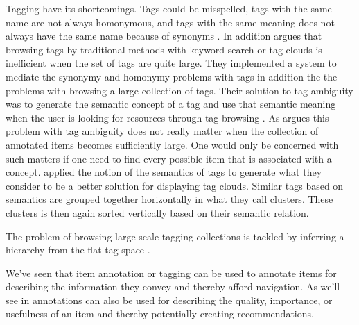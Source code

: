 Tagging have its shortcomings. Tags could be misspelled, tags with the same
name are not always  homonymous, and tags with the same meaning does not
always have the same name because of synonyms \citep[]{aurnhammer06}. In
addition \citet[]{li07} argues that browsing tags by traditional
methods with keyword search or tag clouds is inefficient when the set of tags
are quite large. They implemented a system to mediate the synonymy and
homonymy problems with tags in addition the the problems with browsing a large
collection of tags. Their solution to tag ambiguity
was to generate the semantic concept%
of a tag and use that semantic meaning
when the user is looking for resources through tag browsing
\citep[]{li07}.
As \citet[]{weinberger07} argues this problem
with tag ambiguity does not really matter when the collection of annotated
items becomes sufficiently large. One would only be concerned with such
matters if one need to find every possible item that is associated with a
concept.
\citet[]{hassan06} applied the notion of the semantics of tags to
generate what they consider to be a better solution for displaying tag clouds.
Similar tags based on semantics are grouped together horizontally in what they
call clusters. These clusters is then again sorted vertically based on their
semantic relation.

The problem of browsing large scale tagging collections is tackled by
inferring a hierarchy%
from the flat tag space \citep[]{li07}.

We've seen that item annotation or tagging can be used to annotate items for
describing the information they convey and
thereby afford navigation. As we'll see in
annotations can also be used for describing the quality, importance, or
usefulness of an item and thereby potentially creating recommendations.

